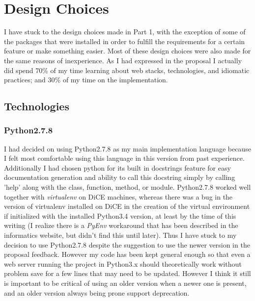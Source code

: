 \documentclass[11pt,a4paper]{article}
\begin{document}
\section{Design Choices}
I have stuck to the design choices made in Part 1, with the exception of some of the packages that were installed in order to fulfill the requirements for a certain feature or make something easier. Most of these design choices were also made for the same reasons of inexperience. As I had expressed in the proposal I actually did spend 70\% of my time learning about web stacks, technologies, and idiomatic practices; and 30\% of my time on the implementation.

\subsection{Technologies}
\subsubsection{Python2.7.8}
I had decided on using Python2.7.8 as my main implementation language because I felt most comfortable using this language in this version from past experience. Additionally I had chosen python for its built in docstrings feature for easy documentation generation and ability to call this docstring simply by calling 'help' along with the class, function, method, or module. Python2.7.8 worked well together with \textit{virtualenv} on DiCE machines, whereas there was a bug in the version of virtualenv installed on DiCE in the creation of the virtual environment if initialized with the installed Python3.4 version, at least by the time of this writing (I realize there is a \textit{PyEnv} workaround that has been described in the informatics website, but didn't find this until later). Thus I have stuck to my decision to use Python2.7.8 despite the suggestion to use the newer version in the proposal feedback. However my code has been kept general enough so that even a web server running the project in Python3.x should theoretically work without problem save for a few lines that may need to be updated. However I think it still is important to be critical of using an older version when a newer one is present, and an older version always being prone support deprecation.
\end{document}
